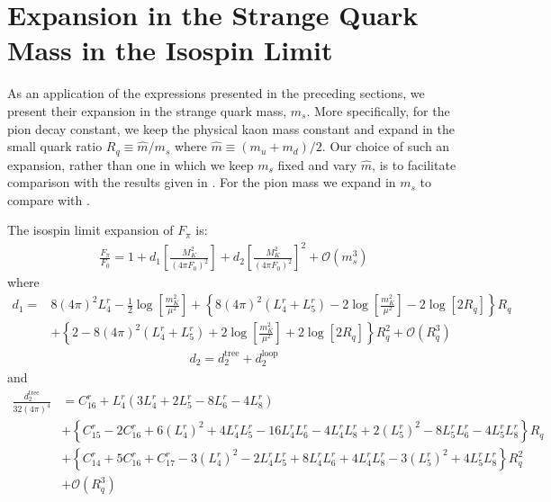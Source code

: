 \documentclass[12pt,a4paper]{article}
\begin{document}
\section{Expansion in the Strange Quark Mass in the Isospin Limit \label{SecExp}}

As an application of the expressions presented in the preceding sections, we present their expansion in the strange quark mass, $m_s$. More specifically, for the pion decay constant, we keep the physical kaon mass constant and expand in the small quark ratio $R_q \equiv \hat{m}/m_s$ where $\hat{m} \equiv (m_u+m_d)/2 $. Our choice of such an expansion, rather than one in which we keep $m_s$ fixed and vary $\hat{m}$, is to facilitate comparison with the results given in \cite{Gasser:2007sg}.
For the pion mass we expand in $m_s$ to compare with \cite{Kaiser:2006uv}.

The isospin limit expansion of $F_{\pi}$ is:
\begin{align}
	\frac{F_{\pi}}{F_0} = 1 + d_1 \left[ \frac{M_K^2}{(4 \pi F_0)^2} \right] + d_2 \left[ \frac{M_K^2}{(4 \pi F_0)^2} \right]^2 + \mathcal{O}(m_s^3) \label{FpiSExp}
\end{align}
where
\begin{align}
	d_1 =&  8 (4 \pi )^2 L^r_4 -\frac{1}{2} \log \left[\frac{m_K^2}{\mu^2}\right] + \left\{ 8 (4 \pi )^2 (L_4^r+L_5^r)-2 \log \left[\frac{m_K^2}{\mu^2}\right] - 2 \log[2R_q] \right\} R_q \nonumber \\
	& + \left\{ 2 -8 (4 \pi )^2 (L_4^r+L_5^r)+2 \log \left[\frac{m_{K}^2}{\mu^2}\right] + 2\log[2R_q] \right\} R_q^2  + \mathcal{O}(R_q^3) \label{d1}
\end{align}	
\begin{align}
	d_2 = d_2^{\text{tree}} + d_2^{\text{loop}} \label{d2}
\end{align}
and
\begin{align}
	\frac{d_2^{\text{tree}}}{32 (4 \pi)^4} &= C_{16}^r + L_{4}^r (3 L_{4}^r + 2 L_{5}^r - 8 L_{6}^r - 4 L_{8}^r) \nonumber \\
	& + \left\{ C^r_{15}-2 C^r_{16}+6 (L^r_{4})^2 + 4 L^r_{4} L^r_{5} - 16 L^r_{4} L^r_{6} - 4 L^r_{4} L^r_{8} + 2 (L^r_{5})^2 - 8 L^r_{5} L^r_{6} - 4 L^r_{5} L^r_{8} \right\} R_q \nonumber \\	
	& + \left\{ C^r_{14}+5 C^r_{16}+C^r_{17}-3 (L^r_{4})^2 - 2 L^r_{4} L^r_{5} + 8 L^r_{4} L^r_{6} + 4 L^r_{4} L^r_{8} - 3 (L^r_{5})^2 + 4 L^r_{5} L^r_{8} \right\} R_q^2 \nonumber \\
	& + \mathcal{O}(R_q^3)
\end{align}
\end{document}
